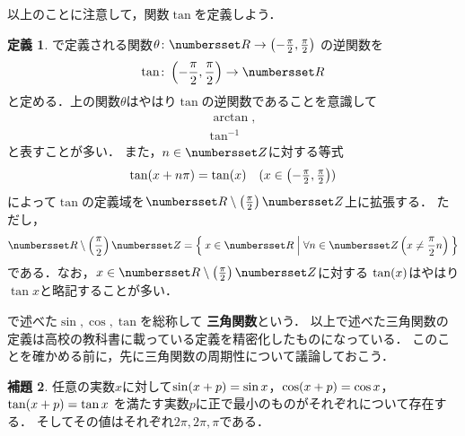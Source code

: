 \documentclass[11pt,a4paper]{ltjsarticle}
\newcommand*{\definition}[1]{\textbf{#1}}
\newcommand*{\maparrow}{\rightarrow}
\newcommand*{\inv}[1]{{#1}^{-1}}
\theoremstyle{definition}
\newtheorem{dfn}{定義}[section]
\newtheorem{lemma}[dfn]{補題}
\begin{document}
以上のことに注意して，関数$\tan$を定義しよう．


\begin{dfn} \label{dfn:tan}
  で定義される関数$\theta \colon \Real \maparrow \interval{op}{- \frac{\pi}{2}, \frac{\pi}{2}}$
  の逆関数を
  \begin{align}
    \tan \colon \interval{op}{- \frac{\pi}{2}, \frac{\pi}{2}} \maparrow \Real
    \label{eq:tan}
  \end{align}
  と定める．上の関数$\theta$はやはり$\tan$の逆関数であることを意識して
  \begin{align}
    \arctan,
    \label{eq:arctan} \\
    \inv{\tan}
    \label{eq:invtan}
  \end{align}
  と表すことが多い．
  また，$n \in \Zahlen$に対する等式
  \begin{align}
    \apply{\tan}{x + n \pi} = \apply{\tan}{x} \quad \text{($\textstyle x \in \interval{op}{- \frac{\pi}{2}, \frac{\pi}{2}}$)}
    \label{eq:tanperiod}
  \end{align}
  によって$\tan$の定義域を$\Real \setminus \paren{\frac{\pi}{2}}\Zahlen$上に拡張する．
  ただし，
  \begin{align}
    \Real \setminus \paren{\frac{\pi}{2}} \Zahlen
    = \setintension{x \in \Real}{\forall n \in \Zahlen \paren{x \neq \frac{\pi}{2} n}}
    \label{eq:tandomain}
  \end{align}
  である．なお，$x \in \Real \setminus \paren{\frac{\pi}{2}} \Zahlen$に対する
  $\apply{\tan}{x}$はやはり$\tan x$と略記することが多い．
\end{dfn}



で述べた$\sin , \cos, \tan$を総称して
\definition{三角関数}という．
以上で述べた三角関数の定義は高校の教科書に載っている定義を精密化したものになっている．
このことを確かめる前に，先に三角関数の周期性について議論しておこう．

\begin{lemma} \label{lemma:period}
  任意の実数$x$に対して$\apply{\sin}{x + p} = \sin x$，$\apply{\cos}{x + p} = \cos x$，$\apply{\tan}{x + p} = \tan x$
  を満たす実数$p$に正で最小のものがそれぞれについて存在する．
  そしてその値はそれぞれ$2 \pi, 2 \pi, \pi$である．
\end{lemma}
\end{document}
